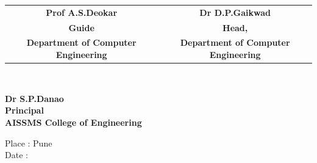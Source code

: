 \vspace{1cm}
\begin{flushleft}


\begin{tabular}{c c } 
\bf Prof A.S.Deokar &\hspace{1.5cm}\bf Dr D.P.Gaikwad \\
\bf Guide&\hspace{1.8cm}\bf Head,\\
\bf Department of Computer Engineering &\hspace{0.75cm} \bf Department of Computer Engineering 
 
\end{tabular}
\end{flushleft}\\
\vspace{1cm}
\begin{center}
\hspace{10mm}\bf{Dr S.P.Danao\\\hspace{5mm}Principal\\\hspace{5mm}AISSMS College of Engineering}
\end{center}
\begin{flushleft}
Place : Pune\\
Date  :  
\end{flushleft}
